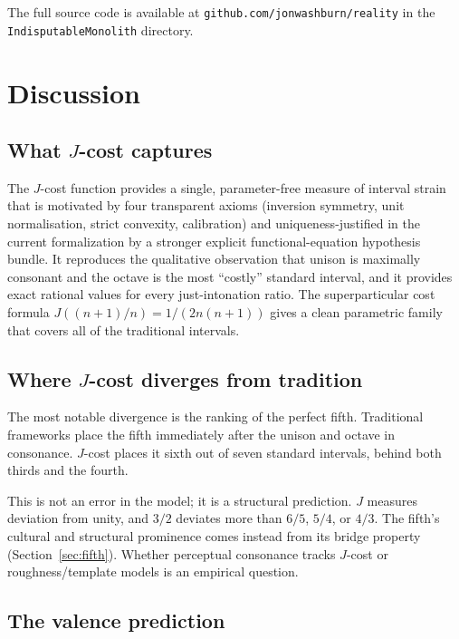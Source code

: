 \documentclass[11pt,a4paper]{article}
\begin{document}
\noindent The full source code is available at
\texttt{github.com/jonwashburn/reality} in the
\texttt{IndisputableMonolith} directory.

\section{Discussion}
\label{sec:discussion}

\subsection{\texorpdfstring{What $J$-cost captures}{What J-cost captures}}

The $J$-cost function provides a single, parameter-free measure of
interval strain that is motivated by four transparent axioms (inversion
symmetry, unit normalisation, strict convexity, calibration) and
uniqueness-justified in the current formalization by a stronger explicit
functional-equation hypothesis bundle.  It
reproduces the qualitative observation that unison is maximally
consonant and the octave is the most ``costly'' standard interval, and
it provides exact rational values for every just-intonation ratio.  The
superparticular cost formula $J((n+1)/n)=1/(2n(n+1))$ gives a clean
parametric family that covers all of the traditional intervals.

\subsection{\texorpdfstring{Where $J$-cost diverges from tradition}{Where J-cost diverges from tradition}}

The most notable divergence is the ranking of the perfect fifth.
Traditional frameworks place the fifth immediately after the unison and
octave in consonance.  $J$-cost places it sixth out of seven standard
intervals, behind both thirds and the fourth.

This is not an error in the model; it is a structural prediction.  $J$
measures deviation from unity, and $3/2$ deviates more than $6/5$,
$5/4$, or $4/3$.  The fifth's cultural and structural prominence comes
instead from its bridge property (Section~\ref{sec:fifth}).  Whether
perceptual consonance tracks $J$-cost or roughness/template models is
an empirical question.

\subsection{The valence prediction}
\end{document}
